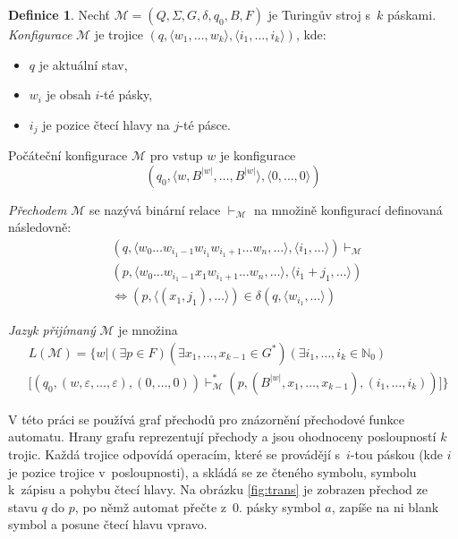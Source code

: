 \documentclass[thesis=B,czech]{FITthesis}[2019/12/23]
\theoremstyle{definition}
\newtheorem{definition}{Definice}[chapter]
\begin{document}
\begin{definition}
Nechť $\mathcal{M} = \left(Q, \Sigma, G, \delta, q_0, B, F\right)$ je Turingův stroj s~$k$ páskami.
\emph{Konfigurace} $\mathcal{M}$ je trojice $\left(q, \langle w_1, \dots, w_k\rangle,  \langle i_1, \dots, i_k\rangle\right)$, kde:
\begin{itemize}
	\item{$q$ je aktuální stav,}
	\item{$w_i$ je obsah $i$-té pásky,}
	\item{$i_j$ je pozice čtecí hlavy na $j$-té pásce.}
\end{itemize}

Počáteční konfigurace $\mathcal{M}$ pro vstup $w$ je konfigurace $$\left(q_0, \langle w, B^{|w|}, \dots, B^{|w|} \rangle,  \langle 0, \dots, 0\rangle\right)$$

\emph{Přechodem} $\mathcal{M}$ se nazývá binární relace $\vdash_\mathcal{M}$ na množině konfigurací definovaná následovně:
\begin{equation}
\begin{split}
&\left(q, \langle w_0 \dots w_{i_1-1}w_{i_1}w_{i_1+1} \dots w_n, \dots \rangle,  \langle i_1, \dots \rangle\right) \vdash_\mathcal{M} \\
&\left(p, \langle w_0 \dots w_{i_1-1}x_1w_{i_1+1} \dots w_n,  \dots \rangle,  \langle i_1+j_1, \dots \rangle \right) \\
&\iff \left(p, \langle\left(x_1, j_1\right),  \dots \rangle\right) \in \delta\left(q, \langle w_{i_1}, \dots \rangle \right)
\end{split}
\end{equation}


\emph{Jazyk přijímaný} $\mathcal{M}$ je množina
\begin{equation}
	\begin{split}
&L\left(\mathcal{M}\right) =\bigg \{ w \mathrel{\bigg|} \left(\exists p \in F \right)  \left(\exists x_1,\dots, x_{k-1} \in G^\ast \right) \left(\exists i_1, \dots, i_{k} \in \mathbb{N}_0 \right) \\ 
&\Big [ \left(q_0, \left(w, \varepsilon, \dots, \varepsilon \right),  \left(0, \dots, 0\right)\right) \vdash_{\mathcal{M}}^{\ast} \left(p, \left(B^{|w|}, x_1,\dots, x_{k-1} \right),  \left(i_1, \dots, i_{k}\right)\right) \Big ] \bigg\}
\end{split}
\end{equation}
\end{definition}

V této práci se používá graf přechodů pro znázornění přechodové funkce automatu. Hrany grafu reprezentují přechody a jsou ohodnoceny posloupností $k$ trojic. Každá trojice odpovídá operacím, které se provádějí s~$i$-tou páskou (kde $i$ je pozice trojice v~posloupnosti), a skládá se ze čteného symbolu, symbolu k~zápisu a pohybu čtecí hlavy. Na obrázku \ref{fig:trans} je zobrazen přechod ze stavu $q$ do $p$, po němž automat přečte z~0. pásky symbol $a$, zapíše na ni blank symbol a posune čtecí hlavu vpravo. 
\end{document}
